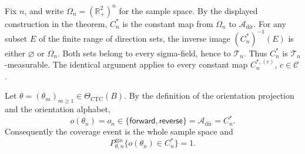 Fix \(n\), and write \(\Omega_n=(\mathbb R_+^2)^n\) for the sample space.  By the displayed construction in the theorem, \(C_n^*\) is the constant map from \(\Omega_n\) to \(\mathcal A_{\mathrm{dir}}\).  For any subset \(E\) of the finite range of direction sets, the inverse image \((C_n^*)^{-1}(E)\) is either \(\varnothing\) or \(\Omega_n\).  Both sets belong to every sigma-field, hence to \(\mathcal T_n\).  Thus \(C_n^*\) is \(\mathcal T_n\)-measurable.  The identical argument applies to every constant map \(C_n^{*,(c)}\), \(c\in\mathcal C\).

Let \(\theta=(\theta_m)_{m\geq1}\in\Theta_{\mathrm{CTC}}(B)\).  By the definition of the orientation projection and the orientation alphabet,
\[
 o(\theta_n)=o_n\in\{\mathsf{forward},\mathsf{reverse}\}
 =\mathcal A_{\mathrm{dir}}=C_n^*.
\]
Consequently the coverage event is the whole sample space and
\[
 P_{\theta,n}^{\otimes n}\{o(\theta_n)\in C_n^*\}=1. \tag{1}
\]
